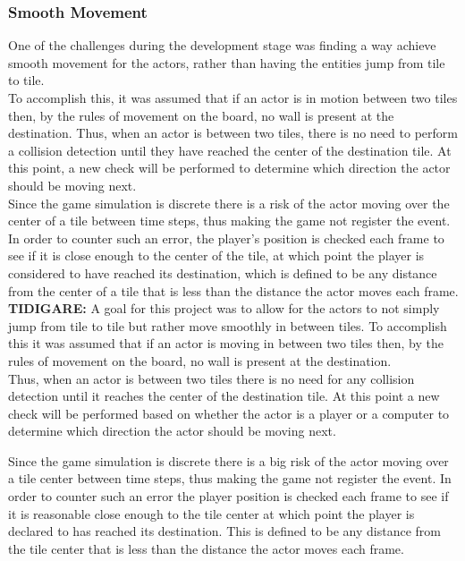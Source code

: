 \documentclass{article}
\begin{document}
        \subsubsection{Smooth Movement}
        One of the challenges during the development stage was finding a way achieve smooth movement for the actors, rather than having the entities jump from tile to tile. \\
        \newline
        To accomplish this, it was assumed that if an actor is in motion between two tiles then, by the rules of movement on the board, no wall is present at the destination. Thus, when an actor is between two tiles, there is no need to perform a collision detection until they have reached the center of the destination tile. At this point, a new check will be performed to determine which direction the actor should be moving next. \\
        \newline
        Since the game simulation is discrete there is a risk of the actor moving over the center of a tile between time steps, thus making the game not register the event. In order to counter such an error, the player's position is checked each frame to see if it is close enough to the center of the tile, at which point the player is considered to have reached its destination, which is defined to be any distance from the center of a tile that is less than the distance the actor moves each frame. \\
        \newline
		\textbf{TIDIGARE:} A goal for this project was to allow for the actors to not simply jump from tile to tile but rather move smoothly in between tiles. To accomplish this it was assumed that if an actor is moving in between two tiles then, by the rules of movement on the board, no wall is present at the destination.\\
            Thus, when an actor is between two tiles there is no need for any collision detection until it reaches the center of the destination tile. At this point a new check will be performed based on whether the actor is a player or a computer to determine which direction the actor should be moving next.

            Since the game simulation is discrete there is a big risk of the actor moving over a tile center between time steps, thus making the game not register the event. In order to counter such an error the player position is checked each frame to see if it is reasonable close enough to the tile center at which point the player is declared to has reached its destination. This is defined to be any distance from the tile center that is less than the distance the actor moves each frame.
\end{document}

